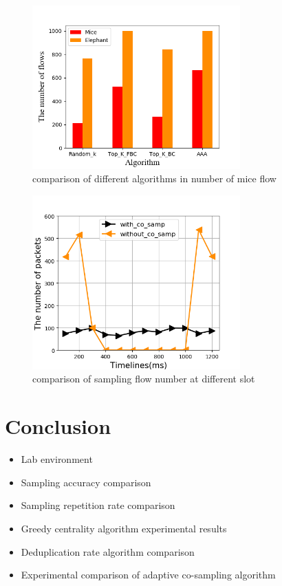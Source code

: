 \documentclass[conference]{IEEEtran}
\begin{document}
\begin{figure}[!hhhhhhhhhht]
\centering
\includegraphics[width=8cm]{images/cmp_mice_flownum.png}
\caption{comparison of different algorithms in number of mice flow}
\label{aaa.png}
\end{figure}

\begin{figure}[!hhhhhhhhhht]
\centering
\includegraphics[width=8cm]{images/num_slot.png}
\caption{comparison of sampling flow number at different slot}
\label{aaa.png}
\end{figure}



\section{Conclusion}
\begin{itemize}
\item Lab environment
\item Sampling accuracy comparison
\item Sampling repetition rate comparison
\item Greedy centrality algorithm experimental results
 
\item Deduplication rate algorithm comparison

\item Experimental comparison of adaptive co-sampling algorithm
\end{itemize}
\end{document}
